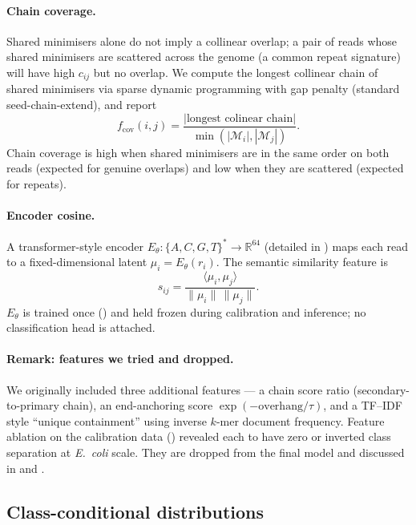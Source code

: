 \documentclass[11pt]{article}
\begin{document}
\paragraph{Chain coverage.}
Shared minimisers alone do not imply a collinear overlap; a pair of reads
whose shared minimisers are scattered across the genome (a common repeat
signature) will have high $c_{ij}$ but no overlap. We compute the longest
collinear chain of shared minimisers via sparse dynamic programming with
gap penalty (standard seed-chain-extend), and report
\begin{equation}
    f_{\text{cov}}(i,j) = \frac{|\text{longest colinear chain}|}{\min(|\mathcal{M}_i|, |\mathcal{M}_j|)}.
\end{equation}
Chain coverage is high when shared minimisers are in the same order on both
reads (expected for genuine overlaps) and low when they are scattered
(expected for repeats).

\paragraph{Encoder cosine.}
A transformer-style encoder $E_\theta : \{A,C,G,T\}^* \to \mathbb{R}^{64}$
(detailed in ) maps each read to a fixed-dimensional
latent $\mu_i = E_\theta(r_i)$. The semantic similarity feature is
\begin{equation}
    s_{ij} = \frac{\langle \mu_i, \mu_j \rangle}{\|\mu_i\|\,\|\mu_j\|}.
\end{equation}
$E_\theta$ is trained once () and held frozen during
calibration and inference; no classification head is attached.

\paragraph{Remark: features we tried and dropped.}
We originally included three additional features --- a chain score ratio
(secondary-to-primary chain), an end-anchoring score
$\exp(-\text{overhang}/\tau)$, and a TF--IDF style ``unique containment''
using inverse $k$-mer document frequency. Feature ablation on the
calibration data () revealed each to have zero or
inverted class separation at \textit{E.\ coli} scale. They are dropped from
the final model and discussed in  and
.

\subsection{Class-conditional distributions}
\end{document}
